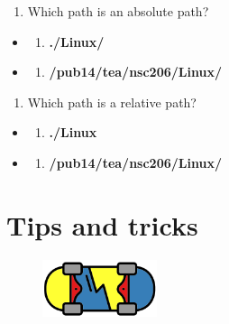 \documentclass[
  letterpaper,
  DIV=11,
  numbers=noendperiod]{scrreprt}
\providecommand{\tightlist}{%
  \setlength{\itemsep}{0pt}\setlength{\parskip}{0pt}}\usepackage{longtable,booktabs,array}
\begin{document}
\begin{enumerate}
\def\labelenumi{\arabic{enumi}.}
\setcounter{enumi}{6}
\tightlist
\item
  Which path is an absolute path?
\end{enumerate}

\begin{itemize}
\item
  \begin{enumerate}
  \def\labelenumi{(\Alph{enumi})}
  \tightlist
  \item
    \textbf{./Linux/}\\
  \end{enumerate}
\item
  \begin{enumerate}
  \def\labelenumi{(\Alph{enumi})}
  \setcounter{enumi}{1}
  \tightlist
  \item
    \textbf{/pub14/tea/nsc206/Linux/}
  \end{enumerate}
\end{itemize}

\begin{enumerate}
\def\labelenumi{\arabic{enumi}.}
\setcounter{enumi}{7}
\tightlist
\item
  Which path is a relative path?
\end{enumerate}

\begin{itemize}
\item
  \begin{enumerate}
  \def\labelenumi{(\Alph{enumi})}
  \tightlist
  \item
    \textbf{./Linux}\\
  \end{enumerate}
\item
  \begin{enumerate}
  \def\labelenumi{(\Alph{enumi})}
  \setcounter{enumi}{1}
  \tightlist
  \item
    \textbf{/pub14/tea/nsc206/Linux/}
  \end{enumerate}
\end{itemize}

\hypertarget{tipsandtricks}{%
\chapter{Tips and tricks}\label{tipsandtricks}}

\begin{figure}

{\centering \includegraphics[width=0.3\textwidth,height=\textheight]{figures/skateboard_trick.png}

}

\end{figure}
\end{document}
